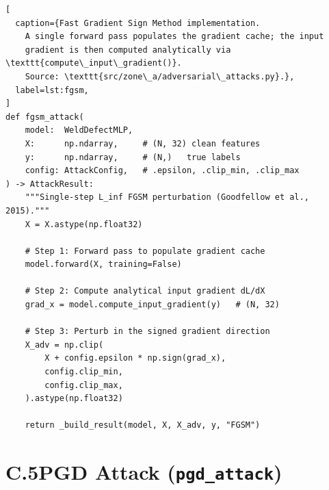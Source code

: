 \begin{lstlisting}[
  caption={Fast Gradient Sign Method implementation.
    A single forward pass populates the gradient cache; the input
    gradient is then computed analytically via \texttt{compute\_input\_gradient()}.
    Source: \texttt{src/zone\_a/adversarial\_attacks.py}.},
  label=lst:fgsm,
]
def fgsm_attack(
    model:  WeldDefectMLP,
    X:      np.ndarray,     # (N, 32) clean features
    y:      np.ndarray,     # (N,)   true labels
    config: AttackConfig,   # .epsilon, .clip_min, .clip_max
) -> AttackResult:
    """Single-step L_inf FGSM perturbation (Goodfellow et al., 2015)."""
    X = X.astype(np.float32)

    # Step 1: Forward pass to populate gradient cache
    model.forward(X, training=False)

    # Step 2: Compute analytical input gradient dL/dX
    grad_x = model.compute_input_gradient(y)   # (N, 32)

    # Step 3: Perturb in the signed gradient direction
    X_adv = np.clip(
        X + config.epsilon * np.sign(grad_x),
        config.clip_min,
        config.clip_max,
    ).astype(np.float32)

    return _build_result(model, X, X_adv, y, "FGSM")
\end{lstlisting}

\section*{C.5\quad PGD Attack (\texttt{pgd\_attack})}

